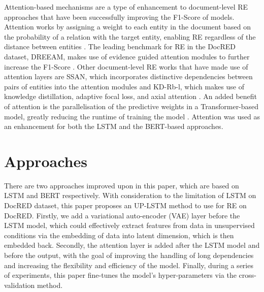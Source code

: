 \documentclass[conference]{IEEEtran}
\begin{document}
Attention-based mechanisms are a type of enhancement to document-level RE approaches that have been successfully improving the F1-Score of models. Attention works by assigning a weight to each entity in the document based on the probability of a relation with the target entity, enabling RE regardless of the distance between entities \cite{vaswani2017attention}. The leading benchmark for RE in the DocRED dataset, DREEAM, makes use of evidence guided attention modules to further increase the F1-Score \cite{ma2023dreeam}. Other document-level RE works that have made use of attention layers are SSAN, which incorporates distinctive dependencies between pairs of entities into the attention modules \cite{xu2021entity} and KD-Rb-l, which makes use of knowledge distillation, adaptive focal loss, and axial attention \cite{tan2022document}. An added benefit of attention is the parallelisation of the predictive weights in a Transformer-based model, greatly reducing the runtime of training the model \cite{vaswani2017attention}. Attention was used as an enhancement for both the LSTM and the BERT-based approaches.

\section{Approaches}

There are two approaches improved upon in this paper, which are based on LSTM\cite{yao2019docred} and BERT\cite{wang2019fine} respectively. With consideration to the limitation of LSTM on DocRED dataset, this paper proposes an UP-LSTM method to use for RE on DocRED. Firstly, we add a variational auto-encoder (VAE) layer before the LSTM model, which could effectively extract features from data in unsupervised conditions via the embedding of data into latent dimension, which is then embedded back. Secondly, the attention layer is added after the LSTM model and before the output, with the goal of improving the handling of long dependencies and increasing the flexibility and efficiency of the model. Finally, during a series of experiments, this paper fine-tunes the model's hyper-parameters via the cross-validation method.
\end{document}

